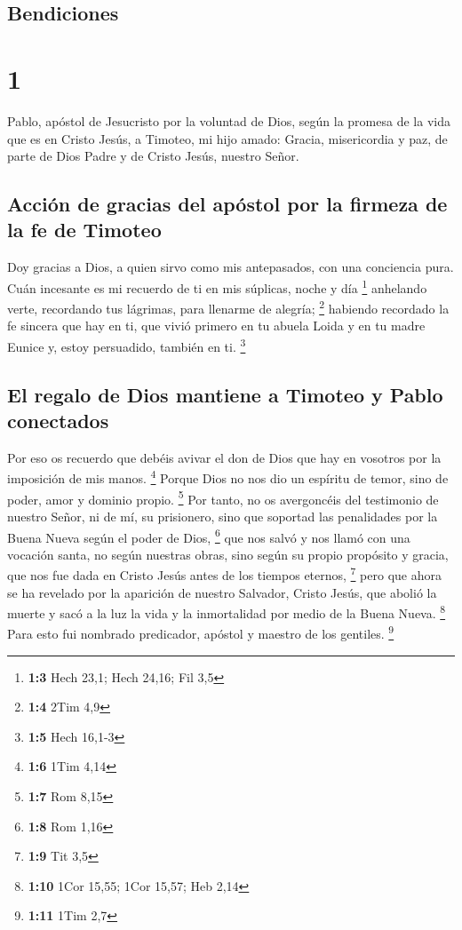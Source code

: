 \hypertarget{bendiciones}{%
\subsection{Bendiciones}\label{bendiciones}}

\hypertarget{section}{%
\section{1}\label{section}}

 Pablo, apóstol de Jesucristo por la voluntad de Dios,
según la promesa de la vida que es en Cristo Jesús,  a
Timoteo, mi hijo amado: Gracia, misericordia y paz, de parte de Dios
Padre y de Cristo Jesús, nuestro Señor.

\hypertarget{acciuxf3n-de-gracias-del-apuxf3stol-por-la-firmeza-de-la-fe-de-timoteo}{%
\subsection{Acción de gracias del apóstol por la firmeza de la fe de
Timoteo}\label{acciuxf3n-de-gracias-del-apuxf3stol-por-la-firmeza-de-la-fe-de-timoteo}}

 Doy gracias a Dios, a quien sirvo como mis antepasados,
con una conciencia pura. Cuán incesante es mi recuerdo de ti en mis
súplicas, noche y día \footnote{\textbf{1:3} Hech 23,1; Hech 24,16; Fil
  3,5}  anhelando verte, recordando tus lágrimas, para
llenarme de alegría; \footnote{\textbf{1:4} 2Tim 4,9} 
habiendo recordado la fe sincera que hay en ti, que vivió primero en tu
abuela Loida y en tu madre Eunice y, estoy persuadido, también en ti.
\footnote{\textbf{1:5} Hech 16,1-3}

\hypertarget{el-regalo-de-dios-mantiene-a-timoteo-y-pablo-conectados}{%
\subsection{El regalo de Dios mantiene a Timoteo y Pablo
conectados}\label{el-regalo-de-dios-mantiene-a-timoteo-y-pablo-conectados}}

 Por eso os recuerdo que debéis avivar el don de Dios que
hay en vosotros por la imposición de mis manos. \footnote{\textbf{1:6}
  1Tim 4,14}  Porque Dios no nos dio un espíritu de temor,
sino de poder, amor y dominio propio. \footnote{\textbf{1:7} Rom 8,15}
 Por tanto, no os avergoncéis del testimonio de nuestro
Señor, ni de mí, su prisionero, sino que soportad las penalidades por la
Buena Nueva según el poder de Dios, \footnote{\textbf{1:8} Rom 1,16}
 que nos salvó y nos llamó con una vocación santa, no
según nuestras obras, sino según su propio propósito y gracia, que nos
fue dada en Cristo Jesús antes de los tiempos eternos, \footnote{\textbf{1:9}
  Tit 3,5}  pero que ahora se ha revelado por la
aparición de nuestro Salvador, Cristo Jesús, que abolió la muerte y sacó
a la luz la vida y la inmortalidad por medio de la Buena Nueva.
\footnote{\textbf{1:10} 1Cor 15,55; 1Cor 15,57; Heb 2,14}
 Para esto fui nombrado predicador, apóstol y maestro de
los gentiles. \footnote{\textbf{1:11} 1Tim 2,7}

